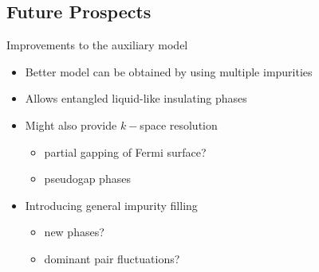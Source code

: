 \documentclass[8pt,aspectratio=169]{beamer}
\begin{document}
\begin{frame}{}
\section{Future Prospects}
\end{frame}

\begin{frame}{Improvements to the auxiliary model}
\begin{itemize}
	\item Better model can be obtained by using multiple impurities\\[20pt]
	\item Allows entangled liquid-like insulating phases\\[20pt]
	\item Might also provide \(k-\)space resolution 
	\begin{itemize}
		\item partial gapping of Fermi surface?
		\item pseudogap phases\\[20pt]
	\end{itemize}
	\item Introducing general impurity filling
	\begin{itemize}
		\item new phases?
		\item dominant pair fluctuations?
	\end{itemize}
\end{itemize}
\end{frame}
\end{document}
